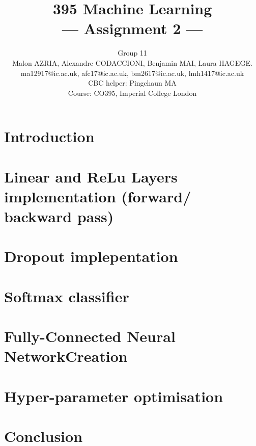 \documentclass[a4paper,11pt]{article}
\title{395 Machine Learning\\\Large{--- Assignment 2 ---}}
\author{Group 11\\Malon AZRIA, Alexandre CODACCIONI, Benjamin MAI,
  Laura HAGEGE.\\
  ma12917@ic.ac.uk, afc17@ic.ac.uk, bm2617@ic.ac.uk, lmh1417@ic.ac.uk \\
       \small{CBC helper: Pingchaun MA}\\
       \small{Course: CO395, Imperial College London}
}
\begin{document}
\maketitle

\section{Introduction}
    

\section{Linear and ReLu Layers implementation (forward/ backward pass)}
    

\section{Dropout implepentation}
    
 
    
\section{Softmax classifier}
    

\newpage
\section{Fully-Connected Neural NetworkCreation}
     


\section{Hyper-parameter optimisation}
	

      
\section{Conclusion}
    
\end{document}
